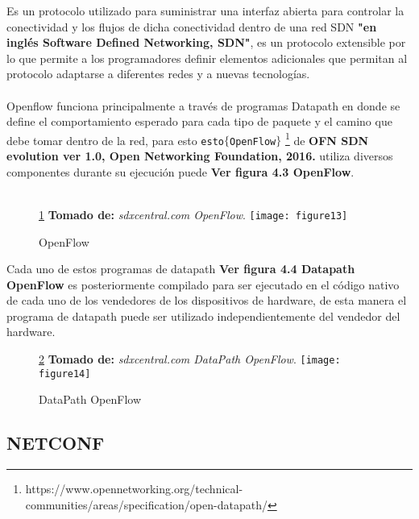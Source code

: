 Es un protocolo utilizado para suministrar una interfaz abierta para controlar la conectividad y los flujos de dicha conectividad dentro de una red SDN \textbf{"en inglés Software Defined Networking, SDN"}, es un protocolo extensible por lo que permite a los programadores definir elementos adicionales que permitan al protocolo adaptarse a diferentes redes y a nuevas tecnologías. 
\\
\\
Openflow funciona principalmente a través de programas Datapath en donde se define el comportamiento esperado para cada tipo de paquete y el camino que debe tomar dentro de la red, para esto \texttt{esto$\{$OpenFlow$\}$} \footnote{https://www.opennetworking.org/technical-communities/areas/specification/open-datapath/} de \textbf{OFN SDN evolution ver 1.0, Open Networking Foundation, 2016.} utiliza diversos componentes durante su ejecución puede \textbf{Ver figura 4.3 OpenFlow}.
\\
\\
\begin{figure}[htbp]
 \ref{fig:OpenFlow} \textbf{Tomado de:} \textit{sdxcentral.com OpenFlow}.
  \centering
    {\texttt{[image: figure13]}}%
  \caption{\footnotesize{OpenFlow}}
  \label{fig:OpenFlow}
\end{figure}
Cada uno de estos programas de datapath \textbf{Ver figura 4.4 Datapath OpenFlow} es posteriormente compilado para ser ejecutado en el código nativo de cada uno de los vendedores de los dispositivos de hardware, de esta manera el programa de datapath puede ser utilizado independientemente del vendedor del hardware.
\begin{figure}[htbp]
 \ref{fig:DataPath} \textbf{Tomado de:} \textit{sdxcentral.com DataPath OpenFlow}.
  \centering
    {\texttt{[image: figure14]}}%
  \caption{\footnotesize{DataPath OpenFlow}}
  \label{fig:DataPath}
\end{figure}

\subsection{NETCONF}

